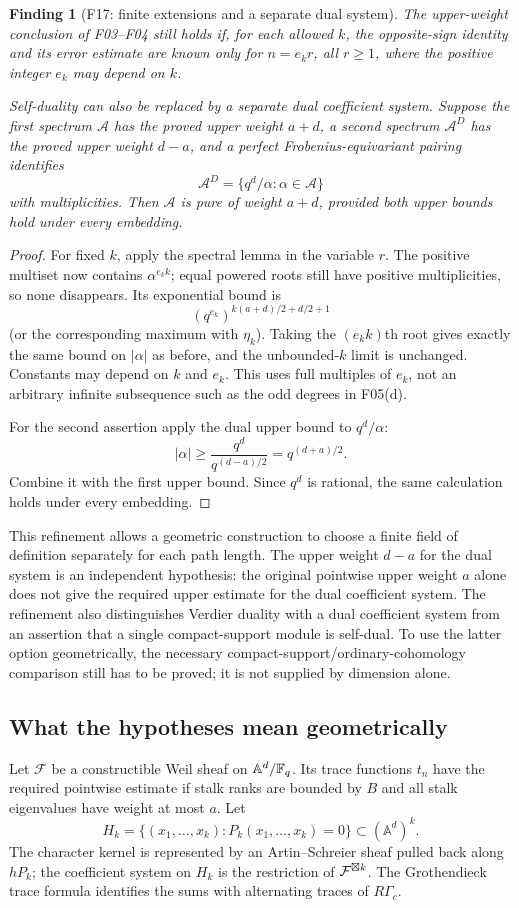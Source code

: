 \documentclass[11pt,a4paper]{article}
\newcommand{\A}{\mathbb A}\newcommand{\PP}{\mathbb P}\newcommand{\GL}{\mathrm{GL}}
\newcommand{\fid}[1]{\textsf{#1}}\newcommand{\gate}[1]{\textsf{#1}}
\theoremstyle{named}\newtheorem{finding}{Finding}[section]
\theoremstyle{definition}\newtheorem{definition}[finding]{Definition}
\theoremstyle{remark}\newtheorem{remark}[finding]{Remark}
\begin{document}
\begin{finding}[\fid{F17}: finite extensions and a separate dual system]\label{f:extensiondual}
The upper-weight conclusion of \fid{F03}--\fid{F04} still holds if, for each allowed $k$, the opposite-sign identity and its error estimate are known only for $n=e_kr$, all $r\ge1$, where the positive integer $e_k$ may depend on $k$.

Self-duality can also be replaced by a separate dual coefficient system. Suppose the first spectrum $\mathcal A$ has the proved upper weight $a+d$, a second spectrum $\mathcal A^D$ has the proved upper weight $d-a$, and a perfect Frobenius-equivariant pairing identifies
\[
 \mathcal A^D=\{q^d/\alpha:\alpha\in\mathcal A\}
\]
with multiplicities. Then $\mathcal A$ is pure of weight $a+d$, provided both upper bounds hold under every embedding.
\end{finding}
\begin{proof}
For fixed $k$, apply the spectral lemma in the variable $r$. The positive multiset now contains $\alpha^{e_kk}$; equal powered roots still have positive multiplicities, so none disappears. Its exponential bound is
\[
 (q^{e_k})^{k(a+d)/2+d/2+1}
\]
(or the corresponding maximum with $\eta_k$). Taking the $(e_kk)$th root gives exactly the same bound on $|\alpha|$ as before, and the unbounded-$k$ limit is unchanged. Constants may depend on $k$ and $e_k$. This uses full multiples of $e_k$, not an arbitrary infinite subsequence such as the odd degrees in \fid{F05}(d).

For the second assertion apply the dual upper bound to $q^d/\alpha$:
\[
 |\alpha|\ge\frac{q^d}{q^{(d-a)/2}}=q^{(d+a)/2}.
\]
Combine it with the first upper bound. Since $q^d$ is rational, the same calculation holds under every embedding.
\end{proof}
This refinement allows a geometric construction to choose a finite field of definition separately for each path length. The upper weight $d-a$ for the dual system is an independent hypothesis: the original pointwise upper weight $a$ alone does not give the required upper estimate for the dual coefficient system. The refinement also distinguishes Verdier duality with a dual coefficient system from an assertion that a single compact-support module is self-dual. To use the latter option geometrically, the necessary compact-support/ordinary-cohomology comparison still has to be proved; it is not supplied by dimension alone.

\subsection{What the hypotheses mean geometrically}\label{sec:tracegeom}
Let $\mathcal F$ be a constructible Weil sheaf on $\A^d/\F_q$. Its trace functions $t_n$ have the required pointwise estimate if stalk ranks are bounded by $B$ and all stalk eigenvalues have weight at most $a$. Let
\[
 H_k=\{(x_1,\ldots,x_k):P_k(x_1,\ldots,x_k)=0\}
 \subset(\A^d)^k.
\]
The character kernel is represented by an Artin--Schreier sheaf pulled back along $hP_k$; the coefficient system on $H_k$ is the restriction of $\mathcal F^{\boxtimes k}$. The Grothendieck trace formula identifies the sums with alternating traces of $R\Gamma_c$.
\end{document}
